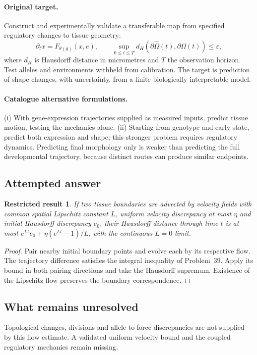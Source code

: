 \documentclass[11pt]{article}
\newtheorem{attemptresult}{Restricted result}[section]
\begin{document}
\paragraph{Original target.}
Construct and experimentally validate a transferable map from specified regulatory changes to tissue geometry:
\[
\partial_t x=F_{\theta(g)}(x,e),\qquad
\sup_{0\leq t\leq T}d_H(\partial\widehat\Omega(t),\partial\Omega(t))\leq\varepsilon,
\]
where $d_H$ is Hausdorff distance in micrometres and $T$ the observation horizon. Test alleles and environments withheld from calibration. The target is prediction of shape changes, with uncertainty, from a finite biologically interpretable model.
\paragraph{Catalogue alternative formulations.}
(i) With gene-expression trajectories supplied as measured inputs, predict tissue motion, testing the mechanics alone. (ii) Starting from genotype and early state, predict both expression and shape; this stronger problem requires regulatory dynamics. Predicting final morphology only is weaker than predicting the full developmental trajectory, because distinct routes can produce similar endpoints.
\subsection{Attempted answer}
\begin{attemptresult}
If two tissue boundaries are advected by velocity fields with common spatial Lipschitz constant $L$, uniform velocity discrepancy at most $\eta$ and initial Hausdorff discrepancy $e_0$, their Hausdorff distance through time $t$ is at most $e^{Lt}e_0+\eta(e^{Lt}-1)/L$, with the continuous $L=0$ limit.
\end{attemptresult}
\begin{proof}
Pair nearby initial boundary points and evolve each by its respective flow. The trajectory difference satisfies the integral inequality of Problem~39. Apply its bound in both pairing directions and take the Hausdorff supremum. Existence of the Lipschitz flow preserves the boundary correspondence.
\end{proof}
\subsection{What remains unresolved}
Topological changes, divisions and allele-to-force discrepancies are not supplied by this flow estimate. A validated uniform velocity bound and the coupled regulatory mechanics remain missing.
\end{document}
